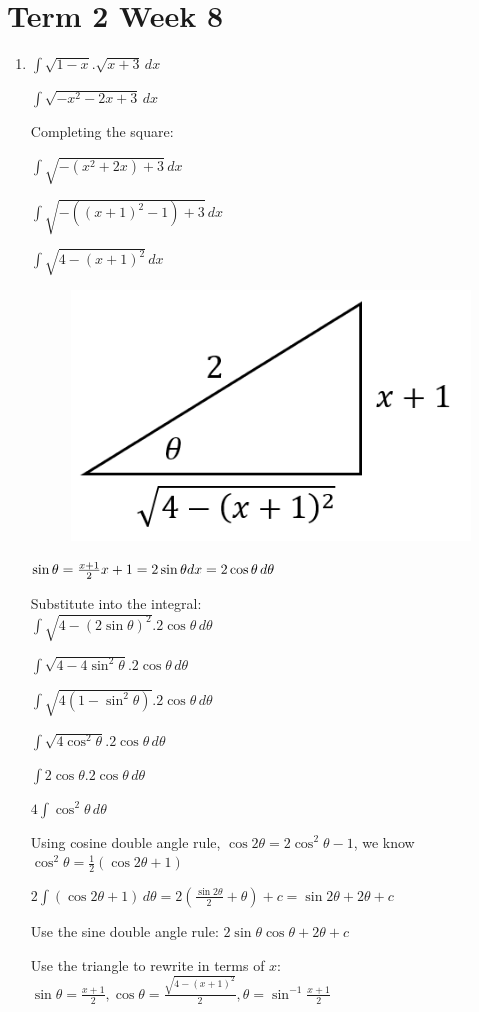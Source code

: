 \documentclass[../main.tex]{subfiles}
\begin{document}
\section*{Term 2 Week 8}

\begin{enumerate}
    \item 
    \(\int \sqrt{1-x}.\sqrt{x+3}\,dx\)

    \(\int \sqrt{-x^2-2x+3}\,dx\)

    Completing the square:

    \(\int \sqrt{-(x^2+2x)+3}\,dx\)

    \(\int \sqrt{-((x+1)^2-1)+3}\,dx\)

    \(\int \sqrt{4-(x+1)^2}\,dx\)

    \begin{figure}[h]
        \includegraphics[width=0.25\linewidth]{../images/t2w8q1a.png}
    \end{figure}
    \(\sin{\theta}=\frac{x+1}{2}\\
    x+1=2\sin{\theta}\\
    dx=2\cos{\theta}\,d\theta\)

    Substitute into the integral:\\
    \(\int \sqrt{4-(2\sin{\theta})^2}.2\cos{\theta}\,d\theta\)

    \(\int \sqrt{4-4\sin^2{\theta}}.2\cos{\theta}\,d\theta\)

    \(\int \sqrt{4(1-\sin^2{\theta})}.2\cos{\theta}\,d\theta\)

    \(\int \sqrt{4\cos^2{\theta}}.2\cos{\theta}\,d\theta\)

    \(\int 2\cos{\theta}.2\cos{\theta}\,d\theta\)

    \(4\int \cos^2{\theta}\,d\theta\)

    Using cosine double angle rule, \(\cos{2\theta}=2\cos^2{\theta}-1\), we know \(\cos^2{\theta}=\frac{1}{2}(\cos{2\theta}+1)\)

    \(2\int (\cos{2\theta}+1)\,d\theta=2(\frac{\sin{2\theta}}{2}+\theta)+c=\sin{2\theta}+2\theta+c\)

    Use the sine double angle rule:
    \(2\sin{\theta}\cos{\theta}+2\theta+c\)

    Use the triangle to rewrite in terms of \(x\):
    \(\sin{\theta}=\frac{x+1}{2}, \cos{\theta}=\frac{\sqrt{4-(x+1)^2}}{2}, \theta=\sin^{-1}{\frac{x+1}{2}}\)


\end{enumerate}
\end{document}
